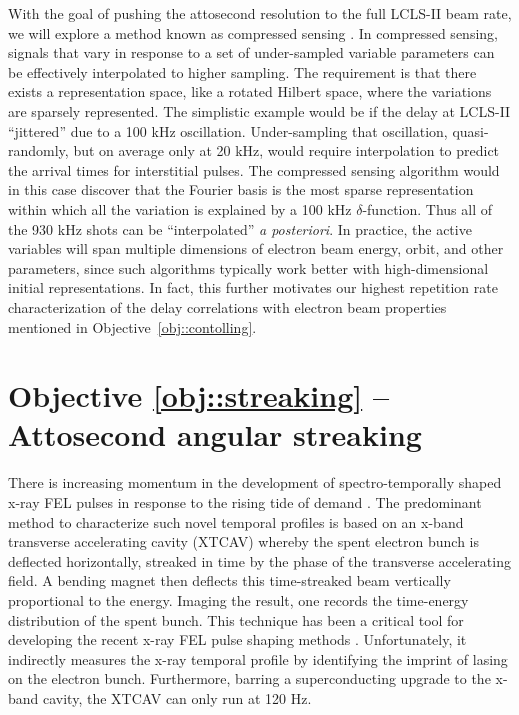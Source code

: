 \documentclass[letterpaper,oneside,11pt]{article}
\begin{document}
With the goal of pushing the attosecond resolution to the full LCLS-II beam rate, we will explore a method known as compressed sensing \cite{Candes2004a,Candes2004b,Candes2005,Elad2006,wired}. 
In compressed sensing, signals that vary in response to a set of under-sampled variable parameters can be effectively interpolated to higher sampling.
The requirement is that there exists a representation space, like a rotated Hilbert space, where the variations are sparsely represented.
The simplistic example would be if the delay at LCLS-II ``jittered'' due to a 100 kHz oscillation.
Under-sampling that oscillation, quasi-randomly, but on average only at 20 kHz, would require interpolation to predict the arrival times for interstitial pulses.
The compressed sensing algorithm would in this case discover that the Fourier basis is the most sparse representation within which all the variation is explained by a 100 kHz $\delta$-function.
Thus all of the 930 kHz shots can be ``interpolated'' \textit{a posteriori}.
In practice, the active variables will span multiple dimensions of electron beam energy, orbit, and other parameters, since such algorithms typically work better with high-dimensional initial representations.
In fact, this further motivates our highest repetition rate characterization of the delay correlations with electron beam properties mentioned in Objective~\ref{obj::contolling}.


\section*{Objective \ref{obj::streaking} -- Attosecond angular streaking}

There is increasing momentum in the development of spectro-temporally shaped x-ray FEL pulses \cite{eehg2009,Lutman13_twocolor,Marinelli13_twocolor,Allaria2014,Marinelli2015,Hemsing2016,Prince2016,Lutman2016,Marinelli2016} in response to the rising tide of demand \cite{Mukamel2007,Biggs2012,Mukamel2013,4WaveMixing,TIGER2015}.
The predominant method to characterize such novel temporal profiles is based on an x-band transverse accelerating cavity (XTCAV) \cite{xtcav2014} whereby the spent electron bunch is deflected horizontally, streaked in time by the phase of the transverse accelerating field.
A bending magnet then deflects this time-streaked beam vertically proportional to the energy.
Imaging the result, one records the time-energy distribution of the spent bunch.
This technique has been a critical tool for developing the recent x-ray FEL pulse shaping methods \cite{Marinelli2015,Marinelli2016}.
Unfortunately, it indirectly measures the x-ray temporal profile by identifying the imprint of lasing on the electron bunch.
Furthermore, barring a superconducting upgrade to the x-band cavity, the XTCAV can only run at 120 Hz.
\end{document}
